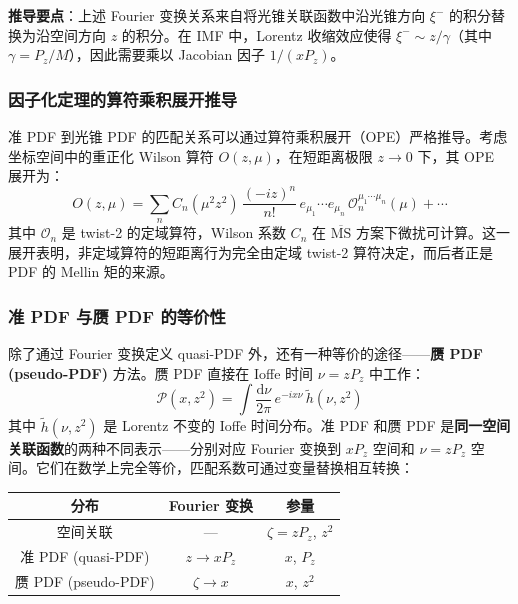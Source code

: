 \documentclass[11pt,a4paper]{ctexart}
\begin{document}
\textbf{推导要点}：上述 Fourier 变换关系来自将光锥关联函数中沿光锥方向 $\xi^-$ 的积分替换为沿空间方向 $z$ 的积分。在 IMF 中，Lorentz 收缩效应使得 $\xi^- \sim z/\gamma$（其中 $\gamma = P_z/M$），因此需要乘以 Jacobian 因子 $1/(xP_z)$。

\subsubsection{因子化定理的算符乘积展开推导}

准 PDF 到光锥 PDF 的匹配关系可以通过算符乘积展开（OPE）严格推导。考虑坐标空间中的重正化 Wilson 算符 $O(z, \mu)$，在短距离极限 $z \to 0$ 下，其 OPE 展开为：
\begin{equation}
O(z, \mu) = \sum_n C_n(\mu^2 z^2) \, \frac{(-iz)^n}{n!} \,
e_{\mu_1}\cdots e_{\mu_n} \, \mathcal{O}_n^{\mu_1\cdots\mu_n}(\mu) + \cdots
\end{equation}
其中 $\mathcal{O}_n$ 是 twist-2 的定域算符，Wilson 系数 $C_n$ 在 $\overline{\text{MS}}$ 方案下微扰可计算。这一展开表明，非定域算符的短距离行为完全由定域 twist-2 算符决定，而后者正是 PDF 的 Mellin 矩的来源。

\subsubsection{准 PDF 与赝 PDF 的等价性}

除了通过 Fourier 变换定义 quasi-PDF 外，还有一种等价的途径——\textbf{赝 PDF (pseudo-PDF)} 方法。赝 PDF 直接在 Ioffe 时间 $\nu = z P_z$ 中工作：
\begin{equation}
\mathcal{P}(x, z^2) = \int \frac{\mathrm{d}\nu}{2\pi} \, e^{-i x \nu} \,
\tilde{h}(\nu, z^2)
\end{equation}
其中 $\tilde{h}(\nu, z^2)$ 是 Lorentz 不变的 Ioffe 时间分布。准 PDF 和赝 PDF 是\textbf{同一空间关联函数}的两种不同表示——分别对应 Fourier 变换到 $x P_z$ 空间和 $\nu = z P_z$ 空间。它们在数学上完全等价，匹配系数可通过变量替换相互转换：
\begin{center}
\begin{tabular}{c|c|c}
\toprule
\textbf{分布} & \textbf{Fourier 变换} & \textbf{参量} \\
\midrule
空间关联 & --- & $\zeta = zP_z$, $z^2$ \\
准 PDF (quasi-PDF) & $z \to xP_z$ & $x$, $P_z$ \\
赝 PDF (pseudo-PDF) & $\zeta \to x$ & $x$, $z^2$ \\
\bottomrule
\end{tabular}
\end{center}
\end{document}
